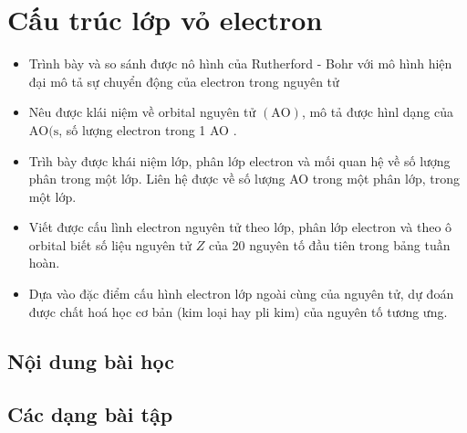 \section{Cấu trúc lớp vỏ electron}
\begin{Muctieu}
	\begin{itemize}
		\item  Trình bày và so sánh được nô hình của Rutherford - Bohr với mô hình hiện đại mô tả sự chuyển động của electron trong nguyên tử
		\item  Nêu được klái niệm về orbital nguyên tử $(\mathrm{AO})$, mô tả được hìnl dạng của $\mathrm{AO}(\mathrm{s}$, số lượng electron trong 1 AO .
		\item  Trìh bày được khái niệm lớp, phân lớp electron và mối quan hệ về số lượng phân trong một lớp. Liên hệ được về số lượng AO trong một phân lớp, trong một lớp.
		\item  Viết được cấu lình electron nguyên tử theo lớp, phân lớp electron và theo ô orbital biết số liệu nguyên tử $Z$ của 20 nguyên tố đầu tiên trong bảng tuần hoàn.
		\item  Dựa vào đặc điểm cấu hình electron lớp ngoài cùng của nguyên tử, dự đoán được chất hoá học cơ bản (kim loại hay pli kim) của nguyên tố tương ưng.
	\end{itemize}
\end{Muctieu}
\subsection{Nội dung bài học}
 
\subsection{Các dạng bài tập}
 